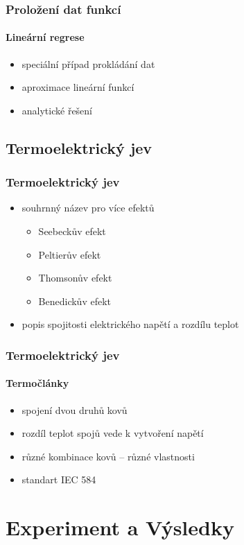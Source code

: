 \documentclass[smaller,aspectratio=1610,handout]{beamer}
\begin{document}
\begin{frame}
	\frametitle{Proložení dat funkcí}
	\framesubtitle{Lineární regrese}
	\begin{itemize}
		\item speciální případ prokládání dat
		\item aproximace lineární funkcí
		\item analytické řešení
	\end{itemize}
\end{frame}

\subsection{Termoelektrický jev}

\begin{frame}
	\frametitle{Termoelektrický jev}
	\begin{itemize}
		\item souhrnný název pro více efektů
			\begin{itemize}
				\item Seebeckův efekt
				\item Peltierův efekt
				\item Thomsonův efekt
				\item Benedickův efekt
			\end{itemize}
		\item popis spojitosti elektrického napětí a rozdílu teplot
	\end{itemize}
\end{frame}

\begin{frame}
	\frametitle{Termoelektrický jev}
	\framesubtitle{Termočlánky}
	\begin{itemize}
		\item spojení dvou druhů kovů
		\item rozdíl teplot spojů vede k vytvoření napětí
		\item různé kombinace kovů -- různé vlastnosti
		\item standart IEC 584
	\end{itemize}
\end{frame}

\section{Experiment a Výsledky}
\end{document}

